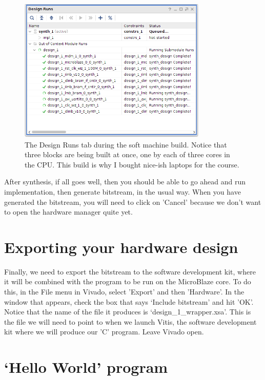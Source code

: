 \documentclass[../physical_computing.tex]{subfiles}
\begin{document}
\begin{figure}[h!]
    \centering
    \includegraphics[width=0.8\textwidth]{appendix_8/figures/designruns.png}
    \caption{The Design Runs tab during the soft machine build. Notice that three blocks are being built at once, one by each
    of three cores in the CPU. This build is why I bought nice-ish laptops for the course.}
    \label{fig:designruns}
\end{figure}

After synthesis, if all goes well, then you should be able to go ahead and run implementation, then generate bitstream, in the usual
way. When you have generated the bitstream, you will need to click on 'Cancel' because we don't want to open the hardware manager
quite yet.

\section{Exporting your hardware design}
\label{sec:export}

Finally, we need to export the bitstream to the software development kit, where it will be combined with the program to be run on the MicroBlaze core. To do this, in the File menu in Vivado, select 'Export' and then 'Hardware'. In the window that appears, check the box that says `Include bitstream' and hit 'OK'. Notice that the name of the file it produces is
`design\_1\_wrapper.xsa'. This is the file we will need to point to when we launch Vitis, the software development kit where we will produce our 'C' program. Leave Vivado open.

\section{`Hello World' program}
\label{sec:helloworld}
\end{document}
